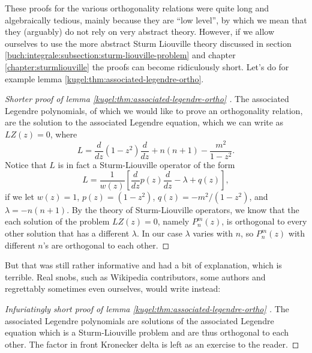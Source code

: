 These proofs for the various orthogonality relations were quite long and
algebraically tedious, mainly because they are ``low level'', by which we mean
that they (arguably) do not rely on very abstract theory. However, if we allow
ourselves to use the more abstract Sturm Liouville theory discussed in section
\ref{buch:integrale:subsection:sturm-liouville-problem} and chapter
\ref{chapter:sturmliouville} the proofs can become ridiculously short. Let's do
for example lemma \ref{kugel:thm:associated-legendre-ortho}.

\begin{proof}[
    Shorter proof of lemma \ref{kugel:thm:associated-legendre-ortho}
  ]
  The associated Legendre polynomials, of which we would like to prove an
  orthogonality relation, are the solution to the associated Legendre equation,
  which we can write as $LZ(z) = 0$, where
  \begin{equation*}
    L = \frac{d}{dz} (1 - z^2) \frac{d}{dz}
      + n(n+1) - \frac{m^2}{1 - z^2}.
  \end{equation*}
  Notice that $L$ is in fact a Sturm-Liouville operator of the form
  \begin{equation*}
    L = \frac{1}{w(z)} \left[
        \frac{d}{dz} p(z) \frac{d}{dz} - \lambda + q(z)
      \right],
  \end{equation*}
  if we let $w(z) = 1$, $p(z) = (1 - z^2 )$, $q(z) = -m^2 / (1 - z^2)$, and
  $\lambda = -n(n+1)$. By the theory of Sturm-Liouville operators, we know that
  the each solution of the problem $LZ(z) = 0$, namely $P^m_n(z)$, is orthogonal
  to every other solution that has a different $\lambda$. In our case $\lambda$
  varies with $n$, so $P^m_n(z)$ with different $n$'s are orthogonal to each
  other.
\end{proof}

But that was still rather informative and had a bit of explanation, which is
terrible. Real snobs, such as Wikipedia contributors, some authors and
regrettably sometimes even ourselves, would write instead:

\begin{proof}[
    Infuriatingly short proof of lemma \ref{kugel:thm:associated-legendre-ortho}
  ]
  The associated Legendre polynomials are solutions of the associated Legendre
  equation which is a Sturm-Liouville problem and are thus orthogonal to each
  other. The factor in front Kronecker delta is left as an exercise to the
  reader.
\end{proof}


